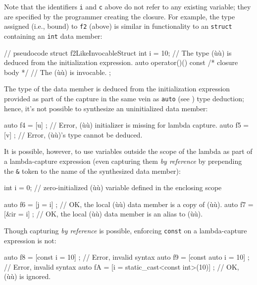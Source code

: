 \noindent Note that the identifiers \lstinline!i! and \lstinline!c! above do not refer
to any existing variable; they are specified by the programmer creating
the closure. For example, the  type assigned (i.e.,
bound) to \lstinline!f2! (above) is similar in functionality to an
 \lstinline!struct! containing an \lstinline!int! data
member:

\begin{emcppslisting}[emcppsstandards={c++14}]
// pseudocode
struct f2LikeInvocableStruct
{
    int i = 10;  // The type (ù{}ù) is deduced from the initialization expression.
    auto operator()() const { /* closure body */ }  // The (ù{}ù) is invocable.
};
\end{emcppslisting}

\noindent The type of the data member is deduced from the initialization
expression provided as part of the capture in the same vein as
\lstinline!auto! (see ) type deduction; hence, it's not possible to
synthesize an uninitialized  data member:

\begin{emcppslisting}
auto f4 = [u]{ };    // Error, (ù{}ù) initializer is missing for lambda capture.
auto f5 = [v{}]{ };  // Error, (ù{}ù)'s type cannot be deduced.
\end{emcppslisting}

\noindent It is possible, however, to use variables outside the scope of the
lambda as part of a lambda-capture expression (even capturing them \emph{by
reference} by prepending the \lstinline!&! token to the name of the
synthesized data member):

\begin{emcppslisting}[emcppsstandards={c++14}]
int i = 0;  // zero-initialized (ù{}ù) variable defined in the enclosing scope

auto f6 = [j   = i]{ };  // OK, the local (ù{}ù) data member is a copy of (ù{}ù).
auto f7 = [&ir = i]{ };  // OK, the local (ù{}ù) data member is an alias to (ù{}ù).
\end{emcppslisting}

\noindent Though capturing \emph{by reference} is possible, enforcing \lstinline!const! on a lambda-capture expression is not:

\begin{emcppslisting}[emcppsstandards={c++14}]
auto f8 = [const i = 10]{ };                    // Error, invalid syntax
auto f9 = [const auto i = 10]{ };               // Error, invalid syntax
auto fA = [i = static_cast<const int>(10)]{ };  // OK, (ù{}ù) is ignored.
\end{emcppslisting}

